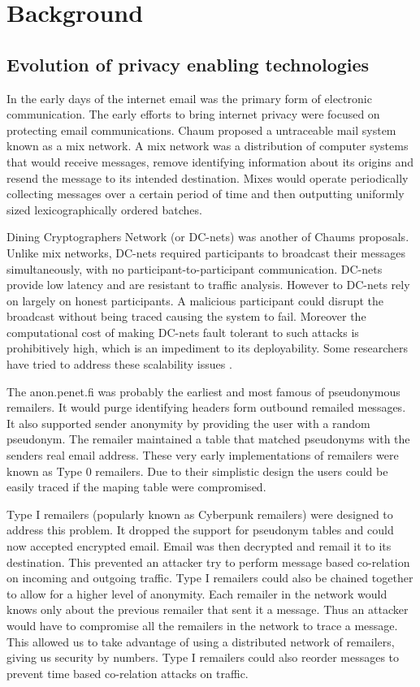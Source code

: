 \documentclass{llncs}
\begin{document}
\section{Background} \label{background}
\subsection{Evolution of privacy enabling technologies}

In the early days of the internet email was the primary form of electronic communication. The early efforts to bring internet privacy were focused on protecting email communications. Chaum proposed a untraceable mail system\cite{chaum-mix} known as a mix network. A mix network was a distribution of computer systems that would receive messages, remove identifying information about its origins and resend the message to its intended destination. Mixes would operate periodically collecting messages over a certain period of time and then outputting uniformly sized lexicographically ordered batches.

Dining Cryptographers Network (or DC-nets) \cite{chaum-dc} was another of Chaums proposals. Unlike mix networks, DC-nets required participants to broadcast their messages simultaneously, with no participant-to-participant communication. DC-nets provide low latency and are resistant to traffic analysis. However to DC-nets rely on largely on honest participants. A malicious participant could disrupt the broadcast without being traced causing the system to fail. Moreover the computational cost of making DC-nets fault tolerant to such attacks is prohibitively high, which is an impediment to its deployability. Some researchers have tried to address these scalability issues \cite{golle:eurocrypt2004}.

The anon.penet.fi was probably the earliest and most famous of pseudonymous remailers. It would purge identifying headers form outbound remailed messages. It also supported sender anonymity by providing the user with a random pseudonym. The remailer maintained a table that matched pseudonyms with the senders real email address. These very early implementations of remailers were known as Type 0 remailers. Due to their simplistic design the users could be easily traced if the maping table were compromised.

Type I remailers (popularly known as Cyberpunk remailers) were designed to address this problem. It dropped the support for pseudonym tables and could now accepted encrypted email. Email was then decrypted and remail it to its destination. This prevented an attacker try to perform message based co-relation on incoming and outgoing traffic. Type I remailers could also be chained together to allow for a higher level of anonymity. Each remailer in the network would knows only about the previous remailer that sent it a message. Thus an attacker would have to compromise all the remailers in the network to trace a message. This allowed us to take advantage of using a distributed network of remailers, giving us security by numbers. Type I remailers could also reorder messages to prevent time based co-relation attacks on traffic.
\end{document}
